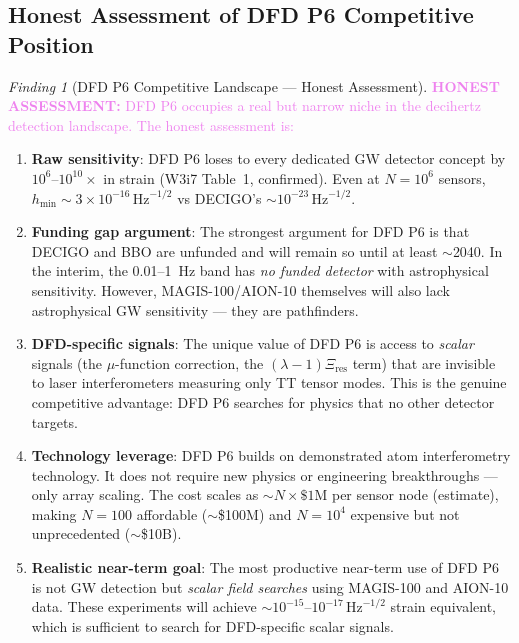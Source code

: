 \documentclass[11pt]{article}
\theoremstyle{definition}
\theoremstyle{remark}
\newtheorem{finding}[theorem]{Finding}
\newcommand{\ee}[1]{\times10^{#1}}
\newcommand{\sqrtHz}{\,\mathrm{Hz}^{-1/2}}
\newcommand{\honest}[1]{\textcolor{violet}{\textbf{HONEST ASSESSMENT:} #1}}
\begin{document}
\subsection{Honest Assessment of DFD P6 Competitive Position}

\begin{finding}[DFD P6 Competitive Landscape --- Honest Assessment]
\label{find:competitive}
\honest{DFD P6 occupies a real but narrow niche in the decihertz detection
landscape. The honest assessment is:}

\begin{enumerate}
\item \textbf{Raw sensitivity}: DFD P6 loses to every dedicated GW detector
  concept by $10^6$--$10^{10}\times$ in strain (W3i7 Table~1, confirmed).
  Even at $N = 10^6$ sensors, $h_{\min} \sim 3\ee{-16}\sqrtHz$ vs
  DECIGO's $\sim 10^{-23}\sqrtHz$.

\item \textbf{Funding gap argument}: The strongest argument for DFD P6 is
  that DECIGO and BBO are unfunded and will remain so until at least $\sim$2040.
  In the interim, the 0.01--1~Hz band has \emph{no funded detector} with
  astrophysical sensitivity. However, MAGIS-100/AION-10 themselves will
  also lack astrophysical GW sensitivity --- they are pathfinders.

\item \textbf{DFD-specific signals}: The unique value of DFD P6 is access
  to \emph{scalar} signals (the $\mu$-function correction, the
  $(\lambda-1)\Xi_{\mathrm{res}}$ term) that are invisible to laser
  interferometers measuring only TT tensor modes. This is the genuine
  competitive advantage: DFD P6 searches for physics that no other
  detector targets.

\item \textbf{Technology leverage}: DFD P6 builds on demonstrated atom
  interferometry technology. It does not require new physics or
  engineering breakthroughs --- only array scaling. The cost scales
  as $\sim N \times \$1$M per sensor node (estimate), making $N = 100$
  affordable ($\sim$\$100M) and $N = 10^4$ expensive but not
  unprecedented ($\sim$\$10B).

\item \textbf{Realistic near-term goal}: The most productive near-term
  use of DFD P6 is not GW detection but \emph{scalar field searches}
  using MAGIS-100 and AION-10 data. These experiments will achieve
  $\sim 10^{-15}$--$10^{-17}\sqrtHz$ strain equivalent, which is
  sufficient to search for DFD-specific scalar signals.
\end{enumerate}
\end{finding}
\end{document}
